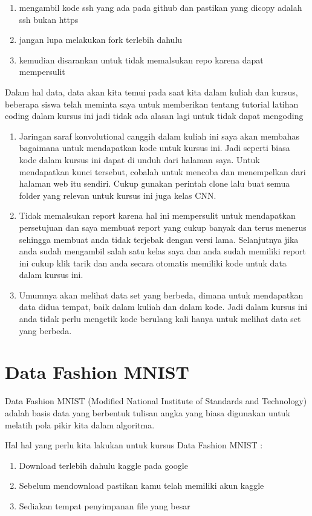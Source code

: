 \begin{enumerate}
\item mengambil kode ssh yang ada pada github dan pastikan yang dicopy adalah ssh bukan https
\item jangan lupa melakukan fork terlebih dahulu
\item kemudian disarankan untuk tidak memalsukan repo karena dapat mempersulit 
\end{enumerate}

Dalam hal data, data akan kita temui pada saat kita dalam kuliah dan kursus, beberapa siswa telah meminta saya untuk memberikan 
tentang tutorial latihan coding dalam kursus ini jadi tidak ada alasan lagi untuk tidak dapat mengoding

\begin{enumerate}
\item Jaringan saraf konvolutional canggih dalam kuliah ini saya akan membahas bagaimana untuk mendapatkan kode untuk kursus ini. Jadi seperti biasa kode dalam kursus ini dapat di unduh dari halaman saya. Untuk mendapatkan kunci tersebut, cobalah untuk mencoba dan menempelkan dari halaman web itu sendiri. Cukup gunakan perintah clone lalu buat semua folder yang relevan untuk kursus ini juga kelas CNN.
\item Tidak memalsukan report karena hal ini mempersulit untuk mendapatkan persetujuan dan saya membuat report yang cukup banyak dan terus menerus sehingga membuat anda tidak terjebak dengan versi lama. Selanjutnya jika anda sudah mengambil salah satu kelas saya dan anda sudah memiliki report ini cukup klik tarik dan anda secara otomatis memiliki kode untuk data dalam kursus ini.
\item Umumnya akan melihat data set yang berbeda, dimana untuk mendapatkan data didua tempat, baik dalam kuliah dan dalam kode. Jadi dalam kursus ini anda tidak perlu mengetik kode berulang kali hanya untuk melihat data set yang berbeda.
\end{enumerate}

\section{Data Fashion MNIST}
Data Fashion MNIST (Modified National Institute of Standards and Technology) adalah basis data yang berbentuk tulisan angka yang biasa digunakan untuk melatih pola pikir kita dalam algoritma.

Hal hal yang perlu kita lakukan untuk kursus Data Fashion MNIST :
\begin{enumerate}
\item Download terlebih dahulu kaggle pada google
\item Sebelum mendownload pastikan kamu telah memiliki akun kaggle 
\item Sediakan tempat penyimpanan file yang besar
\end{enumerate}

